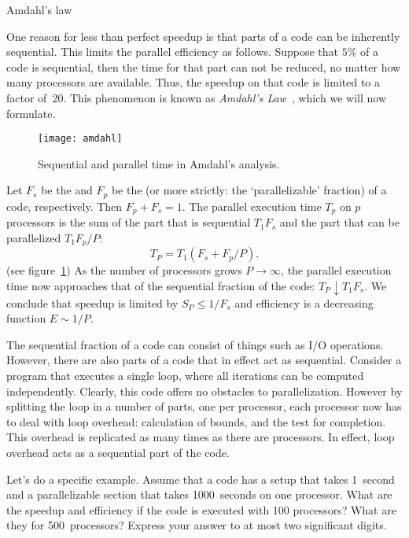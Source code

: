  {Amdahl's law}
\label{sec:amdahl}

One reason for less than perfect speedup is that parts of a code can
be inherently sequential. This limits the parallel efficiency as
follows. Suppose that $5\%$ of a code is sequential, then the time for
that part can not be reduced, no matter how many processors are
available. Thus, the speedup on that code is limited to a factor
of~$20$. This phenomenon is known as \emph{Amdahl's
  Law}~\cite{amd:law}, which we will now formulate.

\begin{figure}[ht]
  \texttt{[image: amdahl]}
  \caption{Sequential and parallel time in Amdahl's analysis.}
  \label{fig:amdahl}
\end{figure}

Let $F_s$ be the
 and
$F_p$ be the  
(or more strictly: the `parallelizable'
fraction) of a code, respectively. Then $F_p+F_s=1$. The parallel
execution time $T_p$ on $p$ processors
is the sum of the part that is sequential
$T_1F_s$ and the part that can be parallelized $T_1F_p/P$:
\begin{equation}
  T_P=T_1(F_s+F_p/P).
  \label{eq:amdahl}
\end{equation}
(see figure~\ref{fig:amdahl})
As the number of processors grows
$P\rightarrow\infty$, the parallel execution time now approaches that
of the sequential fraction of the code: $T_P\downarrow
T_1F_s$. We conclude that speedup is limited by $S_P\leq 1/F_s$ and
efficiency is a decreasing function $E\sim 1/P$.

The sequential fraction of a code can consist of things such as I/O
operations. However, there are also parts of a code that in effect act
as sequential. Consider a program that executes a single loop, where
all iterations can be computed independently.
Clearly, this code offers no obstacles to parallelization.
However by splitting the loop in a number of
parts, one per processor, each processor now has to deal with loop
overhead: calculation of bounds, and the test for completion. This
overhead is replicated as many times as there are processors. In
effect, loop overhead acts as a sequential part of the code.

\begin{exercise}
  Let's do a specific example. Assume that a code has a setup that
  takes 1~second and a parallelizable section that takes 1000~seconds
  on one processor. What are the speedup and efficiency if the code is
  executed with 100 processors? What are they for 500~processors?
  Express your answer to at most two significant digits.
\end{exercise}

